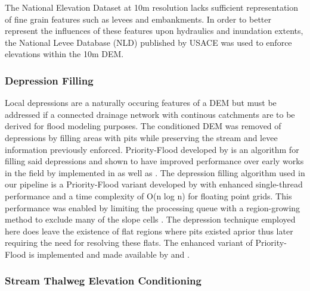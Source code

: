 The National Elevation Dataset at 10m resolution lacks sufficient representation of fine grain features such as levees and embankments.
In order to better represent the influences of these features upon hydraulics and inundation extents, the National Levee Database (NLD) published by USACE was used to enforce elevations within the 10m DEM.



\subsubsection{Depression Filling}

Local depressions are a naturally occuring features of a DEM but must be addressed if a connected drainage network with continous catchments are to be derived for flood modeling purposes.
The conditioned DEM was removed of depressions by filling areas with pits while preserving the stream and levee information previously enforced.
Priority-Flood developed by  is an algorithm for filling said depressions and shown to have improved performance over early works in the field by  implemented in  as well as .
The depression filling algorithm used in our pipeline is a Priority-Flood variant developed by \cite{zhou2016efficient} with enhanced single-thread performance and a time complexity of O(n log n) for floating point grids.
This performance was enabled by limiting the processing queue with a region-growing method to exclude many of the slope cells \cite{zhou2016efficient}.
The depression technique employed here does leave the existence of flat regions where pits existed aprior thus later requiring the need for resolving these flats.
The enhanced variant of Priority-Flood is implemented and made available by  and .

\subsubsection{Stream Thalweg Elevation Conditioning}

